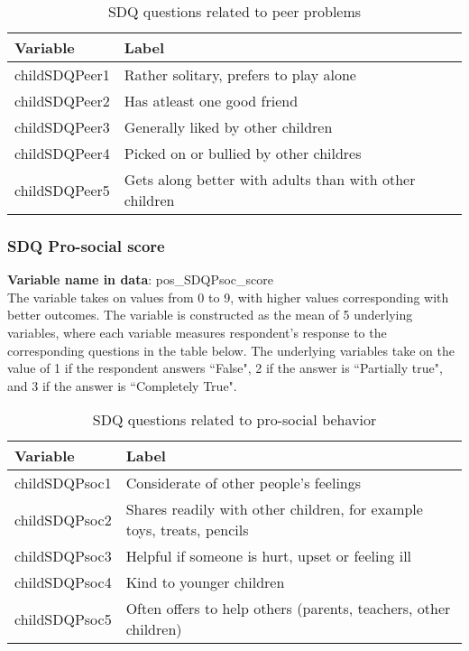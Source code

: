 \begin{table}[H]
\begin{center}
\footnotesize{
\caption{SDQ questions related to peer problems}
\begin{tabular}{l l}
\hline
\textbf{Variable} & \textbf{Label} \\
\hline
childSDQPeer1 & Rather solitary, prefers to play alone\\
childSDQPeer2 & Has atleast one good friend\\
childSDQPeer3 & Generally liked by other children\\
childSDQPeer4 & Picked on or bullied by other childres\\
childSDQPeer5 & Gets along better with adults than with other children\\
\hline
\end{tabular}
}
\end{center}
\end{table}

\subsubsection{SDQ Pro-social score}
\textbf{Variable name in data}: pos\_SDQPsoc\_score \\[.3cm]
The variable takes on values from 0 to 9, with higher values corresponding with better outcomes. The variable is constructed as the mean of 5 underlying variables, where each variable measures respondent's response to the corresponding questions in the table below. The underlying variables take on the value of 1 if the respondent answers  ``False", 2 if the answer is ``Partially true", and 3 if the answer is ``Completely True".  \\

\begin{table}[H]
\begin{center}
\footnotesize{
\caption{SDQ questions related to pro-social behavior}
\begin{tabular}{l l}
\hline
\textbf{Variable} & \textbf{Label} \\
\hline
childSDQPsoc1 & Considerate of other people's feelings\\
childSDQPsoc2 & Shares readily with other children, for example toys, treats, pencils\\
childSDQPsoc3 & Helpful if someone is hurt, upset or feeling ill\\
childSDQPsoc4 & Kind to younger children\\
childSDQPsoc5 & Often offers to help others (parents, teachers, other children)\\
\hline
\end{tabular}
}
\end{center}
\end{table}

